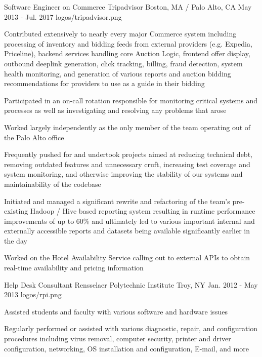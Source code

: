 
\begin{cvexps}


\cvexp
    {Software Engineer on Commerce} %
    {Tripadvisor} %
    {Boston, MA / Palo Alto, CA} %
    {May 2013 - Jul. 2017} %
    {logos/tripadvisor.png} %
    { %
        \begin{cvitems}
            \item{Contributed extensively to nearly every major Commerce system including processing of inventory and bidding feeds from external providers (e.g. Expedia, Priceline), backend services handling core Auction Logic, frontend offer display, outbound deeplink generation, click tracking, billing, fraud detection, system health monitoring, and generation of various reports and auction bidding recommendations for providers to use as a guide in their bidding}
            \item{Participated in an on-call rotation responsible for monitoring critical systems and processes as well as investigating and resolving any problems that arose}
            \item{Worked largely independently as the only member of the team operating out of the Palo Alto office}
            \item{Frequently pushed for and undertook projects aimed at reducing technical debt, removing outdated features and unnecessary cruft, increasing test coverage and system monitoring, and otherwise improving the stability of our systems and maintainability of the codebase}
            \item{Initiated and managed a significant rewrite and refactoring of the team's pre-existing Hadoop / Hive based reporting system resulting in runtime performance improvements of up to 60\% and ultimately led to various important internal and externally accessible reports and datasets being available significantly earlier in the day}
            \item{Worked on the Hotel Availability Service calling out to external APIs to obtain real-time availability and pricing information}
        \end{cvitems}
    }


\cvexp
    {Help Desk Consultant} %
    {Rensselaer Polytechnic Institute} %
    {Troy, NY} %
    {Jan. 2012 - May 2013} %
    {logos/rpi.png} %
    { %
        \begin{cvitems}
            \item{Assisted students and faculty with various software and hardware issues}
            \item{Regularly performed or assisted with various diagnostic, repair, and configuration procedures including virus removal, computer security, printer and driver configuration, networking, OS installation and configuration, E-mail, and more}
        \end{cvitems}
    }


\end{cvexps}
